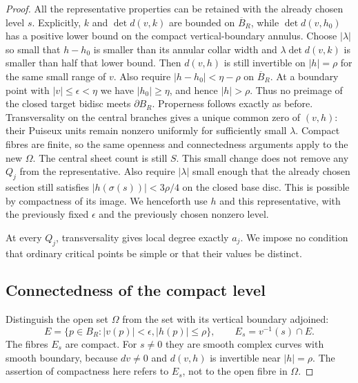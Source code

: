 \documentclass[11pt,a4paper]{article}
\theoremstyle{remark}
\begin{document}
\begin{proof}
All the representative properties can be retained with the already
chosen level $s$.  Explicitly, $k$ and $\det d(v,k)$ are bounded on
$\overline B_R$, while $\det d(v,h_0)$ has a positive lower bound on
the compact vertical-boundary annulus.  Choose $|\lambda|$ so small
that $h-h_0$ is smaller than its annular collar width and
$\lambda\det d(v,k)$ is smaller than half that lower bound.  Then
$d(v,h)$ is still invertible on $|h|=\rho$ for the same small range
of $v$.  Also require $|h-h_0|<\eta-\rho$ on
$\overline B_R$.  At a boundary point with $|v|\le\epsilon<\eta$
we have $|h_0|\ge\eta$, and hence $|h|>\rho$.
Thus no preimage of the closed target bidisc meets
$\partial B_R$.  Properness follows exactly as before.  Transversality
on the central branches gives a unique common zero of $(v,h)$:
their Puiseux units remain nonzero uniformly for sufficiently small
$\lambda$.  Compact fibres are finite, so the same openness and
connectedness arguments apply to the new $\Omega$.  The central sheet
count is still $S$.  This small change does not remove any $Q_j$ from
the representative.  Also require $|\lambda|$ small enough that the
already chosen section still satisfies $|h(\sigma(s))|<3\rho/4$ on
the closed base disc.  This is possible by compactness of its image.
We henceforth use $h$ and this representative, with the previously
fixed $\epsilon$ and the previously chosen nonzero level.

At every $Q_j$, transversality gives local degree exactly $a_j$.
We impose no condition that ordinary critical points be simple or that
their values be distinct.

\subsection{Connectedness of the compact level}

Distinguish the open set $\Omega$ from the set with its vertical boundary
adjoined:
\[
 E=\{p\in B_R:|v(p)|<\epsilon, |h(p)|\le\rho\},
 \qquad E_s=v^{-1}(s)\cap E.
\]
The fibres $E_s$ are compact.  For $s\ne0$ they are smooth complex
curves with smooth boundary, because $dv\ne0$ and $d(v,h)$ is
invertible near $|h|=\rho$.  The assertion of compactness here refers
to $E_s$, not to the open fibre in $\Omega$.


\end{proof}
\end{document}

